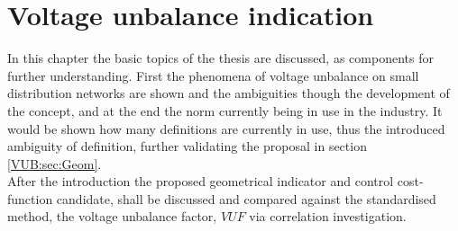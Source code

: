 \chapter{Voltage unbalance indication}\label{BASIC:sec:main}

In this chapter the basic topics of the thesis are discussed, as components for further understanding. First the phenomena of voltage unbalance on small distribution networks are shown and the ambiguities though the development of the concept, and at the end the norm currently being in use in the industry. It would be shown how many definitions are currently in use, thus the introduced ambiguity of definition, further validating the proposal in section \ref{VUB:sec:Geom}.\\
After the introduction the proposed geometrical indicator and control cost-function candidate, shall be discussed and compared against the standardised method, the voltage unbalance factor, $VUF$ via correlation investigation.

